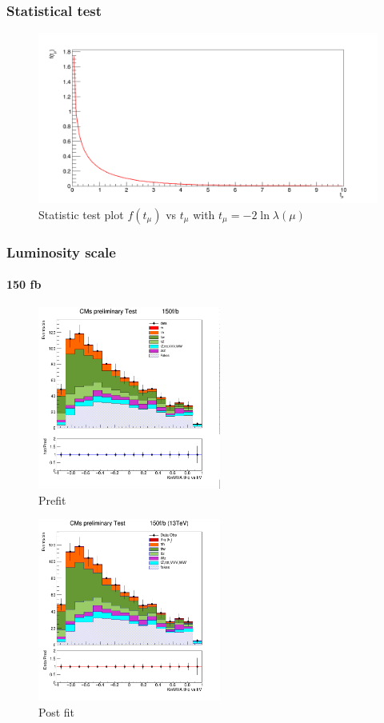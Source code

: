 \documentclass[11pt]{beamer}
\begin{document}
\begin{frame}
\frametitle{Statistical test}
\begin{center}
	\begin{figure}
\includegraphics[scale=0.25]{figures/tmu.png}
\caption{Statistic test plot $f(t_\mu)$ vs $t_\mu$ with $t_\mu=-2\ln{\lambda(\mu)}$}
\end{figure}
\end{center}
\end{frame}




\begin{frame}
\frametitle{Luminosity scale}
\framesubtitle{150 fb}
\begin{multicols}{2}
\begin{center}
	\begin{figure}
		\includegraphics[width=6cm,height=6cm]{figures/150fb/kin.png}
		\caption*{Prefit }
	\end{figure}
\end{center}
\columnbreak
\begin{center}
	\begin{figure}
		\includegraphics[width=6cm,height=6cm]{figures/150fb/simple.png}
		\caption*{Post fit }
	\end{figure}
\end{center}
\end{multicols}
\end{frame}
\end{document}
